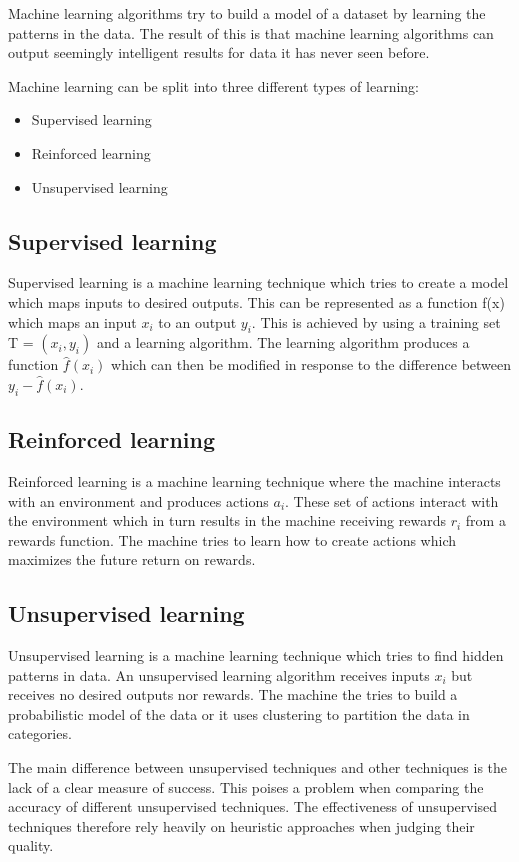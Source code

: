 Machine learning algorithms try to build a model of a dataset by learning the patterns in the data.
The result of this is that machine learning algorithms can output seemingly intelligent results for data it has never seen before.

Machine learning can be split into three different types of learning:
\begin{itemize}
    \item Supervised learning
    \item Reinforced learning
    \item Unsupervised learning
\end{itemize}

\subsection{Supervised learning}
Supervised learning is a machine learning technique which tries to create a model which maps inputs to desired outputs.
This can be represented as a function f(x) which maps an input \(x_i\) to an output \(y_i\).
This is achieved by using a training set T = \((x_i, y_i)\) and a learning algorithm.
The learning algorithm produces a function \(\hat{f}(x_i)\) which can then be modified in response to the difference between \(y_i - \hat{f}(x_i)\).

\subsection{Reinforced learning}
Reinforced learning is a machine learning technique where the machine interacts with an environment and produces actions \(a_i\).
These set of actions interact with the environment which in turn results in the machine receiving rewards \(r_i\) from a rewards function.
The machine tries to learn how to create actions which maximizes the future return on rewards.

\subsection{Unsupervised learning}
Unsupervised learning is a machine learning technique which tries to find hidden patterns in data.
An unsupervised learning algorithm receives inputs \(x_i\) but receives no desired outputs nor rewards.
The machine the tries to build a probabilistic model of the data or it uses clustering to partition the data in categories.

The main difference between unsupervised techniques and other techniques is the lack of a clear measure of success.
This poises a problem when comparing the accuracy of different unsupervised techniques.
The effectiveness of unsupervised techniques therefore rely heavily on heuristic approaches when judging their quality.

